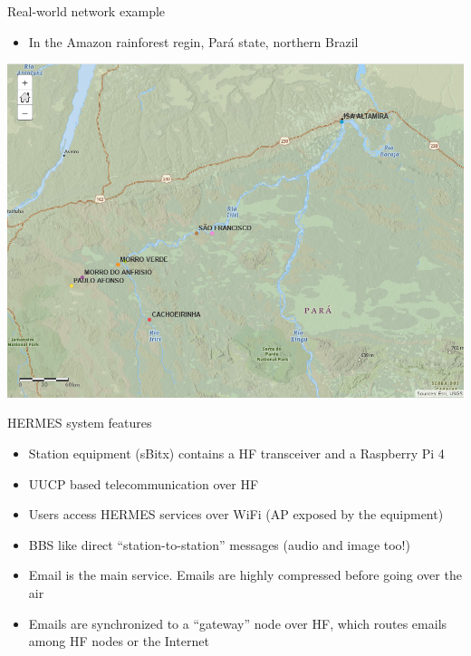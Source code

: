 \documentclass[aspectratio=169,xcolor={x11names,svgnames,dvipsnames}]{beamer}
\begin{document}
\begin{frame}{Real-world network example}

  \begin{itemize}
  \item In the Amazon rainforest regin, Pará state, northern Brazil
  \end{itemize}

\begin{center}
  \includegraphics[width=.57\columnwidth]{radio_stations.png}
\end{center}

\end{frame}


\begin{frame}{HERMES system features}

  \begin{itemize}
    \item Station equipment (sBitx) contains a HF transceiver and a Raspberry Pi 4
    \item UUCP based telecommunication over HF
    \item Users access HERMES services over WiFi (AP exposed by the equipment)
    \item BBS like direct ``station-to-station'' messages (audio and image too!)
    \item Email is the main service. Emails are highly compressed before going over the air
    \item Emails are synchronized to a ``gateway'' node over HF, which routes emails among HF nodes or the Internet
  \end{itemize}

\end{frame}
\end{document}
